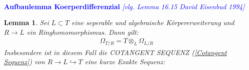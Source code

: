 \documentclass[10pt,a4paper]{report}
\newcommand{\ModulsOfDifferenzials}{David Eisenbud 1994}
\newcounter{Aussage}[chapter]
\newtheorem{lemma}[Aussage]{Lemma}
\newcommand{\divR}[2]{\Omega_{#1/#2}}
\newcommand{\Tensor}[3]{#1 \otimes_{#2} #3}
\begin{document}
\ \\
\textcolor{blue}{\textbf{Aufbaulemma Koerperdifferenzial} \textit{[vlg. Lemma 16.15 \ModulsOfDifferenzials]}}
\begin{lemma}\label{Aufbaulemma Koerperdifferenzial}
Sei $L \subset T$ eine seperable und algebraische Körpererweiterung und $R \longrightarrow L$ ein Ringhomomorphismus. Dann gilt:
\begin{gather*}
\divR{T}{R} = \Tensor{T}{L}{\divR{L}{R}}
\end{gather*}
Insbesondere ist in diesem Fall die COTANGENT SEQUENZ \textit{(\cref{Cotangent Sequenz})} von $R \rightarrow L \hookrightarrow T$ eine kurze Exakte Sequenz:
\begin{center}
\end{center}
\end{lemma}
\end{document}
